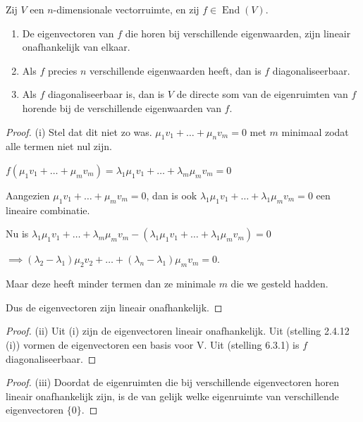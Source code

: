 \begin{stelling}[6.3.4]
    Zij $V$ een $n$-dimensionale vectorruimte, en zij $f \in \operatorname{End}(V)$.
    \begin{enumerate}
        \item[(i)] De eigenvectoren van $f$ die horen bij verschillende eigenwaarden, zijn lineair onafhankelijk van elkaar.
        \item[(ii)] Als $f$ precies $n$ verschillende eigenwaarden heeft, dan is $f$ diagonaliseerbaar.
        \item[(iii)] Als $f$ diagonaliseerbaar is, dan is $V$ de directe som van de eigenruimten van $f$ horende bij de verschillende eigenwaarden van $f$.
    \end{enumerate}
\end{stelling}
\begin{proof}(i)
    Stel dat dit niet zo was. \(\mu_1v_1 + \dots + \mu_n v_m = 0\) met \(m\) minimaal zodat alle termen niet nul zijn.


    \(f(\mu_1v_1 + \dots + \mu_m v_m ) = \lambda_1 \mu_1 v_1 + \dots + \lambda_m \mu_m v_m = 0\)

    Aangezien \(\mu_1v_1 + \dots + \mu_m v_m = 0\), dan is ook \(\lambda_1\mu_1v_1 + \dots + \lambda_1\mu_m v_m = 0\) een lineaire combinatie.

    Nu is \( \lambda_1 \mu_1 v_1 + \dots + \lambda_m \mu_m v_m - (\lambda_1\mu_1v_1 + \dots + \lambda_1\mu_m v_m) = 0 \)

    \(\implies (\lambda_2-\lambda_1)\mu_2 v_2 + \dots + (\lambda_n-\lambda_1)\mu_m v_m = 0 \).

    Maar deze heeft minder termen dan ze minimale \(m\) die we gesteld hadden.

    Dus de eigenvectoren zijn lineair onafhankelijk.

\end{proof}
\begin{proof}(ii)
    Uit (i) zijn de eigenvectoren lineair onafhankelijk. Uit (stelling 2.4.12 (i)) vormen de eigenvectoren een basis voor V.
    Uit (stelling 6.3.1) is \(f\) diagonaliseerbaar. 
\end{proof}
\begin{proof}(iii)
    Doordat de eigenruimten die bij verschillende eigenvectoren horen lineair onafhankelijk zijn,
    is de van gelijk welke eigenruimte van verschillende eigenvectoren \(\{0\}\).
\end{proof}
